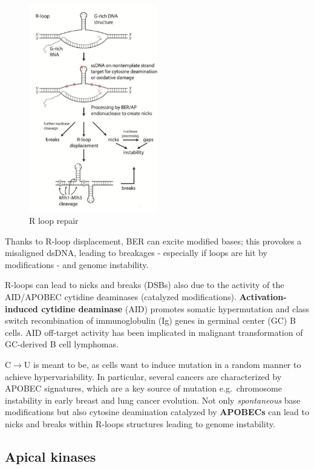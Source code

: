 \begin{figure}
\centering
\includegraphics[width=0.5\textwidth]{../_resources/Screen_Shot_2022-11-30_at_08-51-07.png}
\caption{R loop repair}
\end{figure}

Thanks to R-loop displacement, BER can excite modified bases; this provokes a misaligned dsDNA, leading to breakages - especially if loops are hit by modifications - and genome instability.

R-loops can lead to nicks and breaks (DSBs) also due to the activity of the AID/APOBEC cytidine deaminases (catalyzed modifications). \textbf{Activation-induced cytidine deaminase} (AID) promotes somatic hypermutation and class switch recombination of immunoglobulin (Ig) genes in germinal center (GC) B cells. AID off-target activity has been implicated in malignant transformation of GC-derived B cell lymphomas.

C$\rightarrow$U is meant to be, as cells want to induce mutation in a random manner to achieve hypervariability. In particular, several cancers are characterized by APOBEC signatures, which are a key source of mutation e.g.~chromosome instability in early breast and lung cancer evolution. Not only \emph{spontaneous} base modifications but also cytosine deamination catalyzed by \textbf{APOBECs} can lead to nicks and breaks within R-loops structures leading to genome instability.

\hypertarget{apical-kinases}{%
\subsection{Apical kinases}\label{apical-kinases}}

